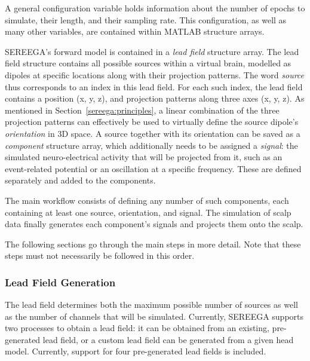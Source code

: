 A general configuration variable holds information about the number of epochs to simulate, their length, and their sampling rate. This configuration, as well as many other variables, are contained within MATLAB structure arrays.

SEREEGA's forward model is contained in a \emph{lead field} structure array. The lead field structure contains all possible sources within a virtual brain, modelled as dipoles at specific locations along with their projection patterns. The word \emph{source} thus corresponds to an index in this lead field. For each such index, the lead field contains a position (x, y, z), and projection patterns along three axes (x, y, z). As mentioned in Section~\ref{sereega:principles}, a linear combination of the three projection patterns can effectively be used to virtually define the source dipole's \emph{orientation} in 3D space. A source together with its orientation can be saved as a \emph{component} structure array, which additionally needs to be assigned a \emph{signal}: the simulated neuro-electrical activity that will be projected from it, such as an event-related potential or an oscillation at a specific frequency. These are defined separately and added to the components.

The main workflow consists of defining any number of such components, each containing at least one source, orientation, and signal. The simulation of scalp data finally generates each component's signals and projects them onto the scalp.

The following sections go through the main steps in more detail. Note that these steps must not necessarily be followed in this order.


\subsubsection{Lead Field Generation}

The lead field determines both the maximum possible number of sources as well as the number of channels that will be simulated. Currently, SEREEGA supports two processes to obtain a lead field: it can be obtained from an existing, pre-generated lead field, or a custom lead field can be generated from a given head model. Currently, support for four pre-generated lead fields is included.

